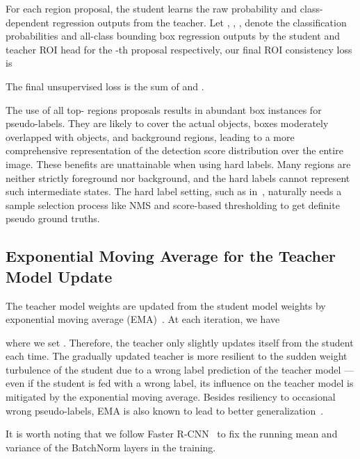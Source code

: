 \documentclass[final]{cvpr}
\begin{document}
For each region proposal, the student learns the raw probability and class-dependent regression outputs from the teacher.
Let , , ,  denote the classification probabilities and all-class bounding box regression outputs by the student and teacher ROI head for the -th proposal respectively, our final ROI consistency loss is

The final unsupervised loss  is the sum of  and .

The use of all top- regions proposals results in abundant box instances for pseudo-labels. 
They are likely to cover the actual objects, boxes moderately overlapped with objects, and background regions, leading to a more comprehensive representation of the detection score distribution over the entire image. 
These benefits are unattainable when using hard labels. Many regions are neither strictly foreground nor background, and the hard labels cannot represent such intermediate states. 
The hard label setting, such as in~\cite{sohn2020simple}, naturally needs a sample selection process like NMS and score-based thresholding to get definite pseudo ground truths.

\subsection{Exponential Moving Average for the Teacher Model Update}

The teacher model weights  are updated from the student model weights  by exponential moving average (EMA)~\cite{tarvainen2017mean}.
At each iteration, we have

where we set .
Therefore, the teacher only slightly updates itself from the student each time.
The gradually updated teacher is more resilient to the sudden weight turbulence of the student due to a wrong label prediction of the teacher model ---  even if the student is fed with a wrong label, its influence on the teacher model is mitigated by the exponential moving average.
Besides resiliency to occasional wrong pseudo-labels, EMA is also known to lead to better generalization~\cite{izmailov2018averaging}.

It is worth noting that we follow Faster R-CNN~\cite{ren2015faster} to fix the running mean and variance of the BatchNorm layers in the training.
\end{document}
